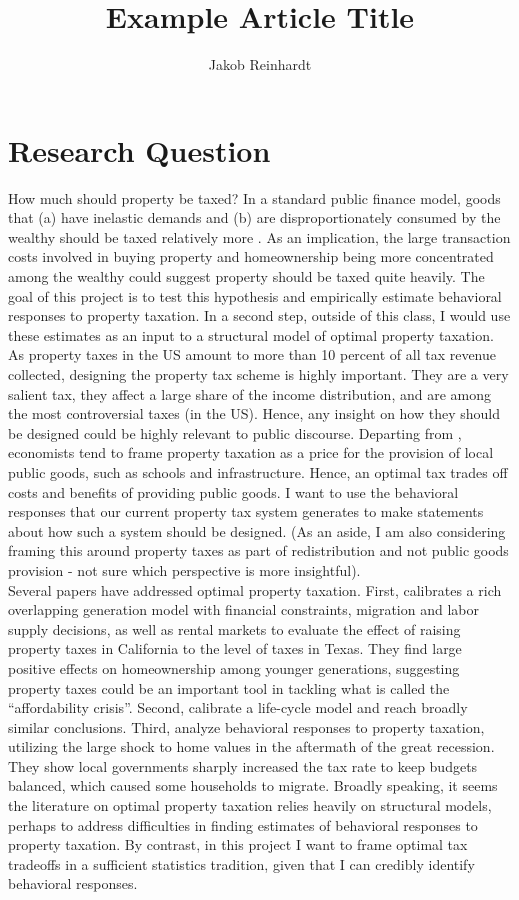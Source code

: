 \documentclass[fleqn,10pt]{olplainarticle}
\title{Example Article Title}
\author[1]{Jakob Reinhardt}
\affil[1]{Yale University}
\begin{document}
\flushbottom
\thispagestyle{empty}

\section*{Research Question} How much should property be taxed? In a standard public finance model, goods that (a) have inelastic demands and (b) are disproportionately consumed by the wealthy should be taxed relatively more \citep{DiamondMirrlees1971a, DiamondMirrlees1971b}. As an implication, the large transaction costs involved in buying property and homeownership being more concentrated among the wealthy could suggest property should be taxed quite heavily. The goal of this project is to test this hypothesis and empirically estimate behavioral responses to property taxation. In a second step, outside of this class, I would use these estimates as an input to a structural model of optimal property taxation.\\
As property taxes in the US amount to more than 10 percent of all tax revenue collected, designing the property tax scheme is highly important. They are a very salient tax, they affect a large share of the income distribution, and are among the most controversial taxes (in the US). Hence, any insight on how they should be designed could be highly relevant to public discourse. Departing from \cite{Tiebout1956}, economists tend to frame property taxation as a price for the provision of local public goods, such as schools and infrastructure. Hence, an optimal tax trades off costs and benefits of providing public goods.  I want to use the behavioral responses that our current property tax system generates to make statements about how such a system should be designed. (As an aside, I am also considering framing this around property taxes as part of redistribution and not public goods provision - not sure which perspective is more insightful).\\
Several papers have addressed optimal property taxation. First, \cite{coven_etal} calibrates a rich overlapping generation model with financial constraints, migration and labor supply decisions, as well as rental markets to evaluate the effect of raising property taxes in California to the level of taxes in Texas. They find large positive effects on homeownership among younger generations, suggesting property taxes could be an important tool in tackling what is called the ``affordability crisis''. Second, \cite{balke_etal} calibrate a life-cycle model and reach broadly similar conclusions. Third, \cite{GieseckeMateen2022} analyze behavioral responses to property taxation, utilizing the large shock to home values in the aftermath of the great recession. They show local governments sharply increased the tax rate to keep budgets balanced, which caused some households to migrate. Broadly speaking, it seems the literature on optimal property taxation relies heavily on structural models, perhaps to address difficulties in finding estimates of behavioral responses to property taxation. By contrast, in this project I want to frame optimal tax tradeoffs in a sufficient statistics tradition, given that I can credibly identify behavioral responses.\\
\end{document}

